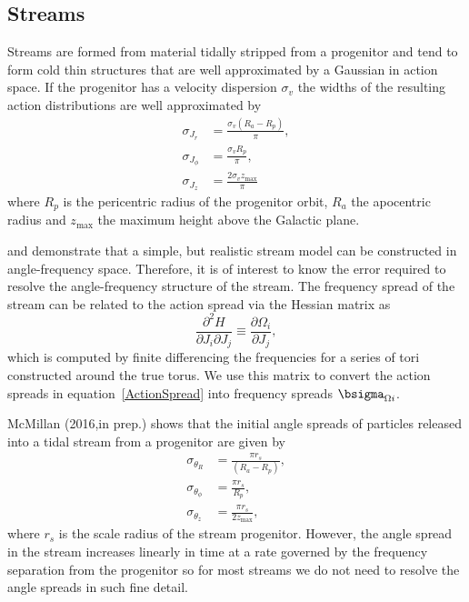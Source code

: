 \documentclass[useAMS,usenatbib,fleqn,a4paper]{mn2e}
\begin{document}
\subsection{Streams}

Streams are formed from material tidally stripped from a progenitor and tend
to form cold thin structures that are well approximated by a Gaussian in
action space. If the progenitor has a velocity dispersion $\sigma_v$ the
widths of the resulting action distributions are well approximated by
\citep{EyreBinney2011}
\begin{equation}
\begin{split}
\sigma_{J_r} &= \frac{\sigma_v(R_a-R_p)}{\pi},\\
\sigma_{J_\phi} &= \frac{\sigma_v R_p}{\pi},\\
\sigma_{J_z} &= \frac{2\sigma_v z_\mathrm{max}}{\pi}
\end{split}
\label{ActionSpread}
\end{equation}
where $R_p$ is the pericentric radius of the progenitor orbit, $R_a$ the
apocentric radius and $z_\mathrm{max}$ the maximum height above the Galactic
plane.

\cite{Bovy2014} and \cite{Sanders2014} demonstrate that a simple, but
realistic stream model can be constructed in angle-frequency space.
Therefore, it is of interest to know the error required to resolve the
angle-frequency structure of the stream. The frequency spread of the stream
can be related to the action spread via the Hessian matrix as
\begin{equation}
\frac{\partial^2 H}{\partial J_i \partial J_j}\equiv \frac{\partial \Omega_i}{\partial J_j},
\end{equation}
which is computed by finite differencing the frequencies for a series of tori
constructed around the true torus. We use this matrix to convert the action
spreads in equation~\eqref{ActionSpread} into frequency spreads
$\bsigma_{\Omega i}$.

McMillan (2016,in prep.) shows that the initial angle spreads of
particles released into a tidal stream from a progenitor are given by
\begin{equation}
\begin{split}
\sigma_{\theta_R} &= \frac{\pi r_s}{(R_a-R_p)},\\
\sigma_{\theta_\phi} &= \frac{\pi r_s}{R_p},\\
\sigma_{\theta_z} &= \frac{\pi r_s}{2 z_\mathrm{max}},
\end{split}
\end{equation}
where $r_s$ is the scale radius of the stream progenitor. However, the angle
spread in the stream increases linearly in time at a rate governed by the
frequency separation from the progenitor so for most streams we do not need
to resolve the angle spreads in such fine detail.

\label{lastpage}
\end{document}
